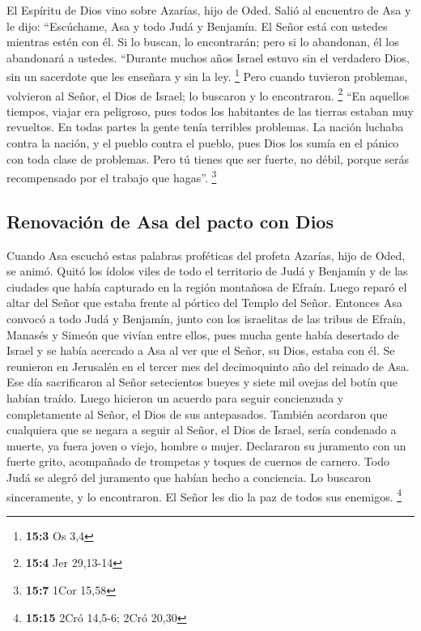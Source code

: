  El Espíritu de Dios vino sobre Azarías, hijo de Oded.
 Salió al encuentro de Asa y le dijo: ``Escúchame, Asa y
todo Judá y Benjamín. El Señor está con ustedes mientras estén con él.
Si lo buscan, lo encontrarán; pero si lo abandonan, él los abandonará a
ustedes.  ``Durante muchos años Israel estuvo sin el
verdadero Dios, sin un sacerdote que les enseñara y sin la ley.
\footnote{\textbf{15:3} Os 3,4}  Pero cuando tuvieron
problemas, volvieron al Señor, el Dios de Israel; lo buscaron y lo
encontraron. \footnote{\textbf{15:4} Jer 29,13-14}  ``En
aquellos tiempos, viajar era peligroso, pues todos los habitantes de las
tierras estaban muy revueltos. En todas partes la gente tenía terribles
problemas.  La nación luchaba contra la nación, y el
pueblo contra el pueblo, pues Dios los sumía en el pánico con toda clase
de problemas.  Pero tú tienes que ser fuerte, no débil,
porque serás recompensado por el trabajo que hagas''. \footnote{\textbf{15:7}
  1Cor 15,58}

\hypertarget{renovaciuxf3n-de-asa-del-pacto-con-dios}{%
\subsection{Renovación de Asa del pacto con
Dios}\label{renovaciuxf3n-de-asa-del-pacto-con-dios}}

 Cuando Asa escuchó estas palabras proféticas del profeta
Azarías, hijo de Oded, se animó. Quitó los ídolos viles de todo el
territorio de Judá y Benjamín y de las ciudades que había capturado en
la región montañosa de Efraín. Luego reparó el altar del Señor que
estaba frente al pórtico del Templo del Señor.  Entonces
Asa convocó a todo Judá y Benjamín, junto con los israelitas de las
tribus de Efraín, Manasés y Simeón que vivían entre ellos, pues mucha
gente había desertado de Israel y se había acercado a Asa al ver que el
Señor, su Dios, estaba con él.  Se reunieron en Jerusalén
en el tercer mes del decimoquinto año del reinado de Asa.
 Ese día sacrificaron al Señor setecientos bueyes y siete
mil ovejas del botín que habían traído.  Luego hicieron
un acuerdo para seguir concienzuda y completamente al Señor, el Dios de
sus antepasados.  También acordaron que cualquiera que se
negara a seguir al Señor, el Dios de Israel, sería condenado a muerte,
ya fuera joven o viejo, hombre o mujer.  Declararon su
juramento con un fuerte grito, acompañado de trompetas y toques de
cuernos de carnero.  Todo Judá se alegró del juramento
que habían hecho a conciencia. Lo buscaron sinceramente, y lo
encontraron. El Señor les dio la paz de todos sus enemigos. \footnote{\textbf{15:15}
  2Cró 14,5-6; 2Cró 20,30}

